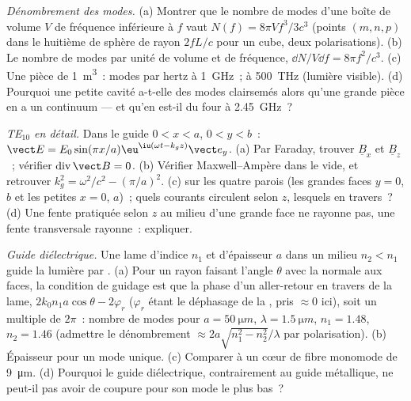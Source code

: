 \begin{exercise}[$\star\star$]\label{exo:b2:guided-waves:9}
\emph{Dénombrement des modes.} (a) Montrer que le nombre de modes d'une boîte de
volume $V$ de fréquence inférieure à $f$ vaut $N(f) = 8\pi Vf^3/3c^3$ (points
$(m, n, p)$ dans le huitième de sphère de rayon $2fL/c$ pour un cube, deux
polarisations). (b) Le nombre de modes par unité de volume et de fréquence,
$\dd N/V\dd f = 8\pi f^2/c^3$. (c) Une pièce de \qty{1}{m^3}~: modes par hertz à
\qty{1}{GHz}~; à \qty{500}{THz} (lumière visible). (d) Pourquoi une petite
cavité a-t-elle des modes clairsemés alors qu'une grande pièce en a un continuum --- et
qu'en est-il du four à \qty{2.45}{GHz}~?
\end{exercise}

\begin{exercise}[$\star\star\star$]\label{exo:b2:guided-waves:10}
\emph{TE$_{10}$ en détail.} Dans le guide $0 < x < a$, $0 < y < b$~: $\vect E =
E_0\sin(\pi x/a)\eu^{\iu(\omega t - k_gz)}\vect e_y$. (a) Par Faraday, trouver $\underline B_x$
et $\underline B_z$~; vérifier $\operatorname{div}\vect B = 0$. (b) Vérifier Maxwell--Ampère
dans le vide, et retrouver $k_g^2 = \omega^2/c^2 - (\pi/a)^2$. (c) 
sur les quatre parois (les grandes faces $y = 0$, $b$ et les petites $x = 0$,
$a$)~; quels courants circulent selon $z$, lesquels en travers~? (d) Une fente pratiquée selon
$z$ au milieu d'une grande face ne rayonne pas, une fente transversale
rayonne~: expliquer.
\end{exercise}

\begin{exercise}[$\star\star\star$]\label{exo:b2:guided-waves:11}
\emph{Guide diélectrique.} Une lame d'indice $n_1$ et d'épaisseur $a$ dans un
milieu $n_2 < n_1$ guide la lumière par . (a) Pour un rayon
faisant l'angle $\theta$ avec la normale aux faces, la condition de guidage est que
la phase d'un aller-retour en travers de la lame, $2k_0n_1a\cos\theta - 2\varphi_r$ ($\varphi_r$
étant le déphasage de la , pris $\approx 0$ ici), soit un multiple
de $2\pi$~: nombre de modes pour $a = \qty{50}{\micro m}$, $\lambda = \qty{1.5}{\micro m}$,
$n_1 = 1.48$, $n_2 = 1.46$ (admettre le dénombrement $\approx 2a\sqrt{n_1^2 - n_2^2}/\lambda$
par polarisation). (b) Épaisseur pour un mode unique. (c) Comparer à un
cœur de fibre monomode de \qty{9}{\micro m}. (d) Pourquoi le guide diélectrique,
contrairement au guide métallique, ne peut-il pas avoir de coupure pour son mode le plus bas~?
\end{exercise}

